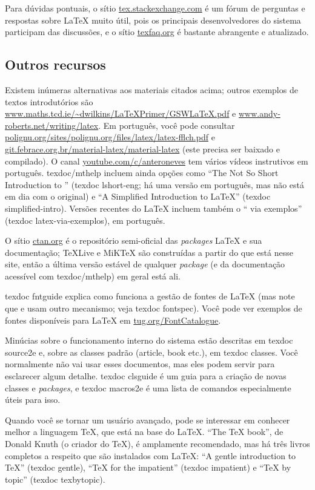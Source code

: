 Para dúvidas pontuais, o sítio \url{tex.stackexchange.com} é um
fórum de perguntas e respostas sobre \LaTeX{} muito útil, pois os
principais desenvolvedores do sistema participam das discussões, e o
sítio \url{texfaq.org} é bastante abrangente e atualizado.

\subsection{Outros recursos}

Existem inúmeras alternativas aos materiais citados acima; outros exemplos de
textos introdutórios são \url{www.maths.tcd.ie/~dwilkins/LaTeXPrimer/GSWLaTeX.pdf}
e \url{www.andy-roberts.net/writing/latex}. Em português, você pode
consultar \url{polignu.org/sites/polignu.org/files/latex/latex-fflch.pdf}
e \url{git.febrace.org.br/material-latex/material-latex} (este precisa ser
baixado e compilado). O canal \url{youtube.com/c/anteroneves} tem vários
vídeos instrutivos em português. \textsf{texdoc/mthelp} incluem ainda
opções como ``The Not So Short Introduction to \LaTeXe{}'' (\textsf{texdoc
lshort-eng}; há uma versão em português, mas não está em dia com o
original) e ``A Simplified Introduction to \LaTeX{}'' (\textsf{texdoc
simplified-intro}). Versões recentes do \LaTeX{} incluem também o
``\LaTeXe{} via exemplos'' (\textsf{texdoc latex-via-exemplos}), em português.

O sítio \url{ctan.org} é o repositório semi-oficial das \textit{packages}
\LaTeX{} e sua documentação; \TeX{}Live e MiK\TeX{} são construídas a
partir do que está nesse site, então a última versão estável de qualquer
\textit{package} (e da documentação acessível com \textsf{texdoc/mthelp})
em geral está ali.

\textsf{texdoc fntguide} explica como funciona a gestão de fontes de
\LaTeX{} (mas note que \LuaLaTeX{} e \XeLaTeX{} usam outro mecanismo;
veja \textsf{texdoc fontspec}). Você pode ver exemplos de fontes
disponíveis para \LaTeX{} em \url{tug.org/FontCatalogue}.

Minúcias sobre o funcionamento interno do sistema estão descritas em
\textsf{texdoc source2e} e, sobre as classes padrão (\textsf{article, book}
etc.), em \textsf{texdoc classes}. Você normalmente não vai usar esses
documentos, mas eles podem servir para esclarecer algum detalhe.
\textsf{texdoc clsguide} é um guia para a criação de novas classes e
\textit{packages}, e \textsf{texdoc macros2e} é uma lista de comandos
especialmente úteis para isso.

Quando você se tornar um usuário avançado, pode se interessar em conhecer
melhor a linguagem \TeX{}, que está na base do \LaTeX{}. ``The \TeX{} book'',
de Donald Knuth (o criador do \TeX), é amplamente recomendado, mas há três
livros completos a respeito que são instalados com \LaTeX{}: ``A gentle
introduction to \TeX{}'' (\textsf{texdoc gentle}), ``\TeX{} for the
impatient'' (\textsf{texdoc impatient}) e ``\TeX{} by topic'' (\textsf{texdoc
texbytopic}).
